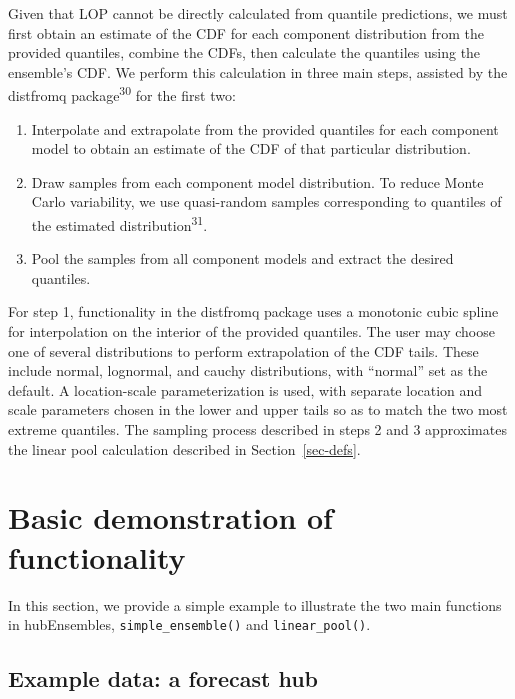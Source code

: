 \documentclass[
  letterpaper,
  DIV=11,
  numbers=noendperiod]{scrartcl}
\providecommand{\tightlist}{%
  \setlength{\itemsep}{0pt}\setlength{\parskip}{0pt}}\usepackage{longtable,booktabs,array}
\begin{document}
Given that LOP cannot be directly calculated from quantile predictions,
we must first obtain an estimate of the CDF for each component
distribution from the provided quantiles, combine the CDFs, then
calculate the quantiles using the ensemble's CDF. We perform this
calculation in three main steps, assisted by the {distfromq}
package\textsuperscript{30} for the first two:

\begin{enumerate}
\def\labelenumi{\arabic{enumi}.}
\tightlist
\item
  Interpolate and extrapolate from the provided quantiles for each
  component model to obtain an estimate of the CDF of that particular
  distribution.
\item
  Draw samples from each component model distribution. To reduce Monte
  Carlo variability, we use quasi-random samples corresponding to
  quantiles of the estimated distribution\textsuperscript{31}.
\item
  Pool the samples from all component models and extract the desired
  quantiles.
\end{enumerate}

For step 1, functionality in the {distfromq} package uses a monotonic
cubic spline for interpolation on the interior of the provided
quantiles. The user may choose one of several distributions to perform
extrapolation of the CDF tails. These include normal, lognormal, and
cauchy distributions, with ``normal'' set as the default. A
location-scale parameterization is used, with separate location and
scale parameters chosen in the lower and upper tails so as to match the
two most extreme quantiles. The sampling process described in steps 2
and 3 approximates the linear pool calculation described in
Section~\ref{sec-defs}.

\section{Basic demonstration of functionality}\label{sec-simple-ex}

In this section, we provide a simple example to illustrate the two main
functions in {hubEnsembles}, \texttt{simple\_ensemble()} and
\texttt{linear\_pool()}.

\subsection{Example data: a forecast
hub}\label{example-data-a-forecast-hub}
\end{document}
